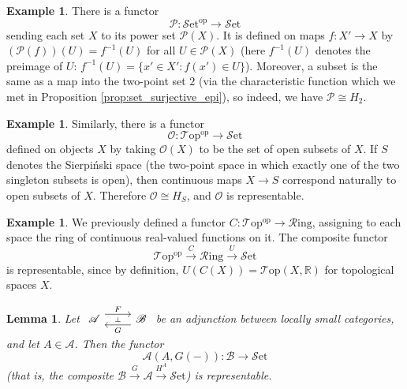 \documentclass[10pt,oneside]{book}
\def\~#1{\mathscr{#1}}
\def\To#1{\xrightarrow{#1}}
\newcommand{\R}{\mathbb{R}}
\newcommand{\op}{\mathrm{op}}
\newcommand{\Set}{\~S\mathrm{et}}
\newcommand{\Ring}{\~R\mathrm{ing}}
\newcommand{\Top}{\~T\mathrm{op}}
\theoremstyle{plain}
\newtheorem{lem}[thm]{Lemma}
\theoremstyle{definition}
\newtheorem{ex}[thm]{Example}
\theoremstyle{remark}
\numberwithin{equation}{section}
\numberwithin{figure}{section}
\begin{document}
\begin{ex}
    There is a functor 
    \[\~P: \Set^\op \to \Set\]
    sending each set $X$ to its power set $\~P(X)$. It is defined on maps $f: X' \to X$ by $(\~P(f))(U) = f^{-1}(U)$ for all $U \in \~P(X)$ (here $f^{-1}(U)$ denotes the preimage of $U$: $f^{-1}(U) = \{x' \in X' : f(x') \in U\}$). Moreover, a subset is the same as a map into the two-point set $2$ (via the characteristic function which we met in Proposition \ref{prop:set_surjective_epi}), so indeed, we have $\~P \cong H_2$.
\end{ex}

\begin{ex}
    Similarly, there is a functor 
    \[\~O: \Top^\op \to \Set\]
    defined on objects $X$ by taking $\~O(X)$ to be the set of open subsets of $X$. If $S$ denotes the Sierpi\'nski space (the two-point space in which exactly one of the two singleton subsets is open), then continuous maps $X \to S$ correspond naturally to open subsets of $X$. Therefore $\~O \cong H_S$, and $\~O$ is representable.
\end{ex}

\begin{ex}
    We previously defined a functor $C: \Top^\op \to \Ring$, assigning to each space the ring of continuous real-valued functions on it. The composite functor 
    \[\Top^\op \To{C} \Ring \To{U} \Set\]
    is representable, since by definition, $U(C(X)) = \Top(X, \R)$ for topological spaces $X$.
\end{ex}

\begin{lem} 
Let $\begin{tikzcd}
    {\~A} & {\~B}
    \arrow[""{name=0, anchor=center, inner sep=0}, "F", shift left=2, from=1-1, to=1-2]
    \arrow[""{name=1, anchor=center, inner sep=0}, "G", shift left=2, from=1-2, to=1-1]
    \arrow["\dashv"{anchor=center, rotate=-90}, draw=none, from=0, to=1]
\end{tikzcd}$ be an adjunction between locally small categories, and let $A \in \~A$. Then the functor 
\[\~A(A, G(-)): \~B \to \Set\]
(that is, the composite $\~B \To{G} \~A \To{H^A} \Set$) is representable.
\end{lem}
\end{document}
